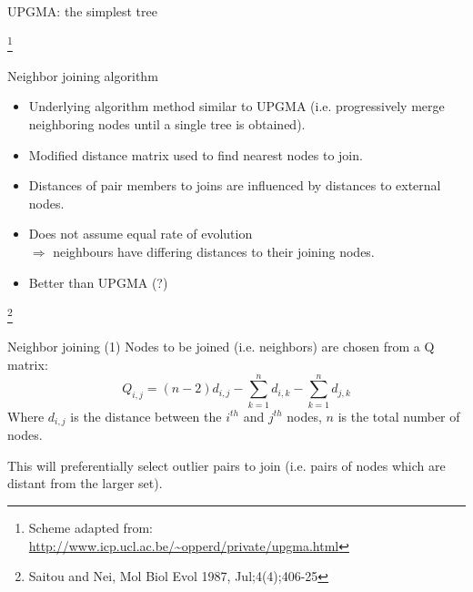 \documentclass[pdf]{beamer}
\newcommand\blfootnote[1]{%
  \begingroup  %
  \renewcommand\thefootnote{}\footnote{#1}%
  \addtocounter{footnote}{-1}  %
  \endgroup
}
\begin{document}
\begin{frame}{UPGMA: the simplest tree}
\begin{figure}[ht]
 \end{figure}
  \blfootnote{Scheme adapted from:\\
    \url{http://www.icp.ucl.ac.be/~opperd/private/upgma.html}
  }
\end{frame}

\begin{frame}{Neighbor joining algorithm}
  \begin{itemize}
  \item Underlying algorithm method similar to UPGMA (i.e. progressively merge
    neighboring nodes until a single tree is obtained).
  \item Modified distance matrix used to find nearest nodes to join.
  \item Distances of pair members to joins are influenced by distances to external nodes.
  \item Does not assume equal rate of evolution\\ $\Rightarrow$ neighbours have
    differing distances to their joining nodes.
  \item Better than UPGMA (?)
  \end{itemize}
\blfootnote{Saitou and Nei, Mol Biol Evol 1987, Jul;4(4);406-25}  
\end{frame}

\begin{frame}{Neighbor joining (1)}
  Nodes to be joined (i.e. neighbors) are chosen from a Q matrix:
  $$
  Q_{i,j} = (n-2)d_{i,j} - \sum_{k=1}^n{d_{i,k}} - \sum_{k=1}^n{d_{j,k}}
  $$
  Where $d_{i,j}$ is the distance between the $i^{th}$ and $j^{th}$ nodes, $n$ is
  the total number of nodes.

  This will preferentially select outlier pairs to join (i.e. pairs of nodes
  which are distant from the larger set).
\end{frame}
\end{document}
